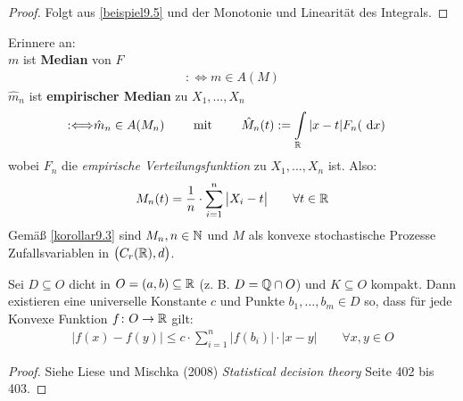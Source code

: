 \begin{proof}
	Folgt aus \ref{beispiel9.5} und der Monotonie und Linearität des Integrals.
\end{proof}

Erinnere an:\\
$m$ ist \textbf{Median} von $F$
\begin{align*}
	:\Longleftrightarrow m\in A(M)
\end{align*}
$\hat{m}_n$ ist \textbf{empirischer Median} zu $X_1,\ldots,X_n$
\begin{align*}
	:\Longleftrightarrow&\hat{m}_n\in A(M_n)
	\qquad\text{ mit }\qquad
	\hat{M}_n(t):=\int\limits_{\mathbb{R}}|x-t| F_n(\text{ d} x)
\end{align*}
wobei $F_n$ die \textit{empirische Verteilungsfunktion} zu $X_1,\ldots,X_n$ ist.
Also:
\begin{align*}
	M_n(t)=\frac{1}{n}\cdot\sum\limits_{i=1}^n\big|X_i-t\big|\qquad\forall t\in\mathbb{R}
\end{align*}
Gemäß \ref{korollar9.3} sind $M_n,n\in\mathbb{N}$ und $M$ als	 konvexe stochastische Prozesse Zufallsvariablen in $\big(C_r(\mathbb{R}),d\big)$.

\begin{satz}\label{satz9.7}
	Sei $D\subseteq O$ dicht in $O=(a,b)\subseteq\mathbb{R}$ (z. B. $D=\mathbb{Q}\cap O$) und $K\subseteq O$ kompakt.
	Dann existieren eine universelle Konstante $c$ und Punkte $b_1,\ldots,b_m\in D$ so, dass für jede Konvexe Funktion $f\colon O\to\mathbb{R}$ gilt:
	\begin{align*}
		\big|f(x)-f(y)\big|\leq c\cdot\sum\limits_{i=1}^n\big|f(b_i)\big|\cdot|x-y|\qquad\forall x,y\in O
	\end{align*}
\end{satz}

\begin{proof}
	Siehe Liese und Mischka (2008) \textit{Statistical decision theory} Seite 402 bis 403.
\end{proof}


